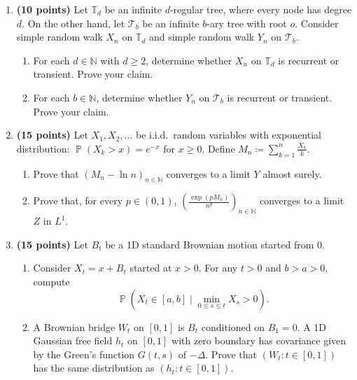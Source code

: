 \documentclass[11pt,a4paper]{article}
\DeclareMathOperator{\Pbb}{\mathbb{P}}
\begin{document}
\begin{enumerate}[label=\textbf{\arabic*.}]
    \item \textbf{(10 points)} Let $\mathbb{T}_d$ be an infinite $d$-regular tree, where every node has degree $d$. On the other hand, let $\mathcal{T}_b$ be an infinite $b$-ary tree with root $o$. Consider simple random walk $X_n$ on $\mathbb{T}_d$ and simple random walk $Y_n$ on $\mathcal{T}_b$.
    \begin{enumerate}[label=(\alph*)]
        \item For each $d \in \mathbb{N}$ with $d \ge 2$, determine whether $X_n$ on $\mathbb{T}_d$ is recurrent or transient. Prove your claim.
        \item For each $b \in \mathbb{N}$, determine whether $Y_n$ on $\mathcal{T}_b$ is recurrent or transient. Prove your claim.
    \end{enumerate}

    \item \textbf{(15 points)} Let $X_1, X_2, \dots$ be i.i.d.\ random variables with exponential distribution: $\Pbb(X_k > x) = e^{-x}$ for $x \ge 0$. Define $M_n \coloneqq \sum_{k=1}^n \frac{X_k}{k}$.
    \begin{enumerate}[label=(\alph*)]
        \item Prove that $(M_n - \ln n)_{n \in \mathbb{N}}$ converges to a limit $Y$ almost surely.
        \item Prove that, for every $p \in (0, 1)$, $\left( \frac{\exp(p M_n)}{n^p} \right)_{n \in \mathbb{N}}$ converges to a limit $Z$ in $L^1$.
    \end{enumerate}

    \item \textbf{(15 points)} Let $B_t$ be a 1D standard Brownian motion started from 0.
    \begin{enumerate}[label=(\alph*)]
        \item Consider $X_t = x + B_t$ started at $x > 0$. For any $t > 0$ and $b > a > 0$, compute
        \[
        \Pbb \left( X_t \in [a, b] \;\Big|\; \min_{0 \le s \le t} X_s > 0 \right).
        \]
        \item A Brownian bridge $W_t$ on $[0, 1]$ is $B_t$ conditioned on $B_1 = 0$. A 1D Gaussian free field $h_t$ on $[0, 1]$ with zero boundary has covariance given by the Green's function $G(t, s)$ of $-\Delta$. Prove that $(W_t : t \in [0, 1])$ has the same distribution as $(h_t : t \in [0, 1])$.
    \end{enumerate}


\end{enumerate}
\end{document}
